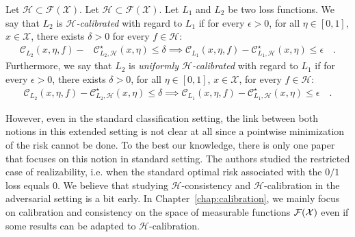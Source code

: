     
\begin{definition}
Let $\mathcal{H}\subset \mathcal{F}(\mathcal{X})$. Let $\mathcal{H}\subset \mathcal{F}(\mathcal{X})$. Let $L_1$ and $L_2$ be two loss functions. We say that $L_2$ is \emph{$\mathcal{H}$-calibrated} with regard to $L_1$ if for every $\epsilon>0$,  for all $\eta\in[0,1]$, $x\in\mathcal{X}$, there exists $ \delta>0$ for every $f\in\mathcal{H}$: 
\begin{align*}
    \mathcal{C}_{L_2}(x,\eta,f)- &\mathcal{C}^\star_{L_2,\mathcal{H}}(x,\eta)\leq\delta\implies\mathcal{C}_{L_1}(x,\eta,f)- \mathcal{C}^\star_{L_1,\mathcal{H}}(x,\eta)\leq \epsilon\quad.
\end{align*}
Furthermore, we say that $L_2$ is \emph{uniformly $\mathcal{H}$-calibrated} with regard to $L_1$ if for every $\epsilon>0$, there exists $ \delta>0$, for all $\eta\in[0,1]$, $x\in\mathcal{X}$, for every $f\in\mathcal{H}$: 
\begin{align*}
    \mathcal{C}_{L_2}(x,\eta,f)- \mathcal{C}^\star_{L_2,\mathcal{H}}(x,\eta)\leq\delta\implies\mathcal{C}_{L_1}(x,\eta,f)- \mathcal{C}^\star_{L_1,\mathcal{H}}(x,\eta)\leq \epsilon\quad.
\end{align*}
\end{definition}
    

However, even in the standard classification setting, the link between both notions in this extended setting is not clear at all since a pointwise minimization of the risk cannot be done. To the best our knowledge, there is only one paper~\citep{long2013consistency} that focuses on this notion in standard setting. The authors studied the restricted case of realizability, i.e. when the standard optimal risk associated with the $0/1$ loss equals $0$.  We believe that studying  $\mathcal{H}$-consistency and  $\mathcal{H}$-calibration in the adversarial setting is a bit early. In Chapter~\ref{chap:calibration}, we mainly focus on calibration and consistency on the space of measurable functions $\mathcal{F}(\mathcal{X})$ even if some results can be adapted to $\mathcal{H}$-calibration. 




